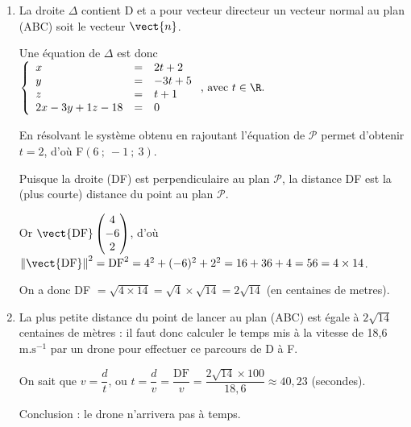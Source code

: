 \begin{enumerate}[resume]
\begin{enumerate}
$7t - 28 = 0 \iff 7t = 28 \iff t = 4$.

D'où les coordonnées de E en remplaçant $t$ par dans les équations de $d$ : E(14~;~9~;~17)
	\end{enumerate}
	\item 
La droite $\Delta$ contient D et a pour vecteur directeur un vecteur normal au plan (ABC) soit le vecteur $\vect{n}$.

Une équation de $\Delta$ est donc $\left\{\begin{array}{l c l}
x&=&2t+2\\y&=&-3t+5\\z&=&t+1\\
2x - 3y + 1z - 18 &=& 0
\end{array}\right.\text{, avec } t \in \R.$

En résolvant le système obtenu en rajoutant l'équation de $\mathcal{P}$ permet d'obtenir $t = 2$, d'où F$(6~;~-1~;~3)$.

Puisque la droite (DF) est perpendiculaire au plan $\mathcal{P}$, la distance DF est la (plus courte) distance du point au plan $\mathcal{P}$.

Or $\vect{\text{DF}}\begin{pmatrix}4\\-6\\2\end{pmatrix}$, d'où $\left\|\vect{\text{DF}}\right\|^2 = \text{DF}^2 = 4^2 + (-6)^2 + 2^2 = 16 + 36 + 4 = 56 = 4 \times 14$.

On a donc DF $ = \sqrt{4 \times 14} = \sqrt 4 \times \sqrt{14} = 2\sqrt{14}$ (en centaines de metres).
	

	\item 
	

La plus petite distance du point de lancer au plan (ABC) est égale à $2\sqrt{14}$ centaines de mètres : il faut donc calculer le temps mis à la vitesse de 18,6~$\text{m.s}^{-1}$ par un drone pour effectuer ce parcours de D à F.

On sait que $v = \dfrac{d}{t}$, ou $t = \dfrac{d}{v} = \dfrac{\text{DF}}{v} = \dfrac{2\sqrt{14} \times 100}{18,6} \approx 40,23$ (secondes).

Conclusion : le drone n'arrivera pas à temps.
\end{enumerate}
